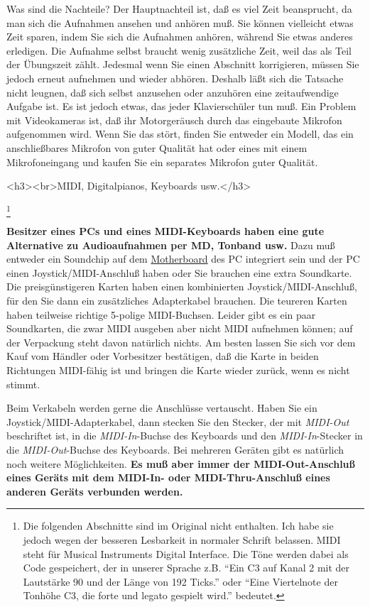 Was sind die Nachteile?
Der Hauptnachteil ist, daß es viel Zeit beansprucht, da man sich die Aufnahmen ansehen und anhören muß.
Sie können vielleicht etwas Zeit sparen, indem Sie sich die Aufnahmen anhören, während Sie etwas anderes erledigen.
Die Aufnahme selbst braucht wenig zusätzliche Zeit, weil das als Teil der Übungszeit zählt.
Jedesmal wenn Sie einen Abschnitt korrigieren, müssen Sie jedoch erneut aufnehmen und wieder abhören.
Deshalb läßt sich die Tatsache nicht leugnen, daß sich selbst anzusehen oder anzuhören eine zeitaufwendige Aufgabe ist.
Es ist jedoch etwas, das jeder Klavierschüler tun muß.
Ein Problem mit Videokameras ist, daß ihr Motorgeräusch durch das eingebaute Mikrofon aufgenommen wird.
Wenn Sie das stört, finden Sie entweder ein Modell, das ein anschließbares Mikrofon von guter Qualität hat oder eines mit einem  Mikrofoneingang und kaufen Sie ein separates Mikrofon guter Qualität.


\hypertarget{c1iii13MIDI}{}

<h3><br>MIDI, Digitalpianos, Keyboards usw.</h3>

\footnote{Die folgenden Abschnitte sind im Original nicht enthalten.
Ich habe sie jedoch wegen der besseren Lesbarkeit in normaler Schrift belassen.
MIDI steht für Musical Instruments Digital Interface. Die Töne werden dabei als Code gespeichert, der in unserer Sprache z.B. \enquote{Ein C3 auf Kanal 2 mit der Lautstärke 90 und der Länge von 192 Ticks.} oder \enquote{Eine Viertelnote der Tonhöhe C3, die forte und legato gespielt wird.} bedeutet.}


\textbf{Besitzer eines PCs und eines MIDI-Keyboards haben eine gute Alternative zu Audioaufnahmen per MD, Tonband usw.}
Dazu muß entweder ein Soundchip auf dem \hyperlink{Motherboard}{Motherboard} des PC integriert sein und der PC einen Joystick/MIDI-Anschluß haben oder Sie brauchen eine extra Soundkarte.
Die preisgünstigeren Karten haben einen kombinierten Joystick/MIDI-Anschluß, für den Sie dann ein zusätzliches Adapterkabel brauchen.
Die teureren Karten haben teilweise richtige 5-polige MIDI-Buchsen.
Leider gibt es ein paar Soundkarten, die zwar MIDI ausgeben aber nicht MIDI aufnehmen können; auf der Verpackung steht davon natürlich nichts.
Am besten lassen Sie sich vor dem Kauf vom Händler oder Vorbesitzer bestätigen, daß die Karte in beiden Richtungen MIDI-fähig ist und bringen die Karte wieder zurück, wenn es nicht stimmt.

Beim Verkabeln werden gerne die Anschlüsse vertauscht.
Haben Sie ein Joystick/MIDI-Adapterkabel, dann stecken Sie den Stecker, der mit \textit{MIDI-Out} beschriftet ist, in die \textit{MIDI-In}-Buchse des Keyboards und den \textit{MIDI-In}-Stecker in die \textit{MIDI-Out}-Buchse des Keyboards.
Bei mehreren Geräten gibt es natürlich noch weitere Möglichkeiten.
\textbf{Es muß aber immer der MIDI-Out-Anschluß eines Geräts mit dem MIDI-In- oder MIDI-Thru-Anschluß eines anderen Geräts verbunden werden.}

